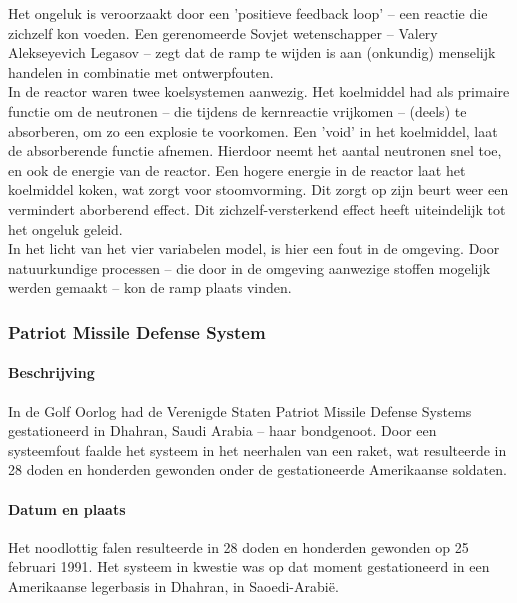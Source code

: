 \documentclass{article}
\begin{document}
				Het ongeluk is veroorzaakt door een 'positieve feedback loop' -- een reactie die zichzelf kon voeden. Een gerenomeerde Sovjet wetenschapper -- Valery Alekseyevich Legasov -- zegt dat de ramp te wijden is aan (onkundig) menselijk handelen in combinatie met ontwerpfouten. \\
				In de reactor waren twee koelsystemen aanwezig. Het koelmiddel had als primaire functie om de neutronen -- die tijdens de kernreactie vrijkomen -- (deels) te absorberen, om zo een explosie te voorkomen. Een 'void' in het koelmiddel, laat de absorberende functie afnemen. Hierdoor neemt het aantal neutronen snel toe, en ook de energie van de reactor. Een hogere energie in de reactor laat het koelmiddel koken, wat zorgt voor stoomvorming. Dit zorgt op zijn beurt weer een vermindert aborberend effect. Dit zichzelf-versterkend effect heeft uiteindelijk tot het ongeluk geleid. \\
				In het licht van het vier variabelen model, is hier een fout in de omgeving. Door natuurkundige processen -- die door in de omgeving aanwezige stoffen mogelijk werden gemaakt -- kon de ramp plaats vinden. \par
			
			\subsubsection{Patriot Missile Defense System}

				\paragraph{Beschrijving}

					In de Golf Oorlog had de Verenigde Staten Patriot Missile Defense Systems gestationeerd in Dhahran, Saudi Arabia -- haar bondgenoot. Door een systeemfout faalde het systeem in het neerhalen van een raket, wat resulteerde in 28 doden en honderden gewonden onder de gestationeerde Amerikaanse soldaten. \par

				\paragraph{Datum en plaats}

					Het noodlottig falen resulteerde in 28 doden en honderden gewonden op 25 februari 1991. Het systeem in kwestie was op dat moment gestationeerd in een Amerikaanse legerbasis in Dhahran, in Saoedi-Arabië. \cite{general1992patriot} \par
\end{document}
